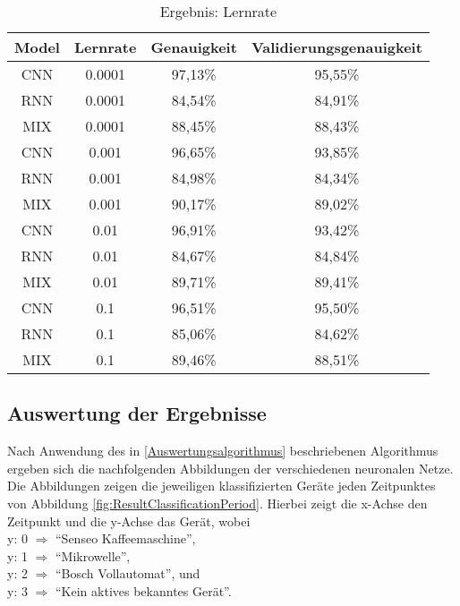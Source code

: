         \begin{table}[H]
            \centering
            \begin{tabular}{|c|c|c|c|}
                \hline
                Model & Lernrate & Genauigkeit & Validierungsgenauigkeit \\
                \hline
                CNN & 0.0001 & 97,13\% & 95,55\% \\
                \hline
                RNN & 0.0001 & 84,54\% & 84,91\% \\
                \hline
                MIX & 0.0001 & 88,45\% & 88,43\% \\
                \hline
                \hline
                CNN & 0.001  & 96,65\% & 93,85\% \\
                \hline
                RNN & 0.001  & 84,98\% & 84,34\% \\
                \hline
                MIX & 0.001  & 90,17\% & 89,02\% \\
                \hline
                \hline
                CNN & 0.01   & 96,91\% & 93,42\% \\
                \hline
                RNN & 0.01   & 84,67\% & 84,84\% \\
                \hline
                MIX & 0.01   & 89,71\% & 89,41\% \\
                \hline
                \hline
                CNN & 0.1    & 96,51\% & 95,50\% \\
                \hline
                RNN & 0.1    & 85,06\% & 84,62\% \\
                \hline
                MIX & 0.1    & 89,46\% & 88,51\% \\
                \hline
            \end{tabular}
            \caption{Ergebnis: Lernrate}
            \label{tabl:ErgebnisLernrate}
        \end{table}   


    \subsection{Auswertung der Ergebnisse}

        Nach Anwendung des in \ref{Auswertungsalgorithmus} beschriebenen Algorithmus ergeben sich die nachfolgenden Abbildungen der verschiedenen neuronalen Netze.
        Die Abbildungen zeigen die jeweiligen klassifizierten Geräte jeden Zeitpunktes von Abbildung \ref{fig:ResultClassificationPeriod}.
        Hierbei zeigt die x-Achse den Zeitpunkt und die y-Achse das Gerät, wobei \\
        y: 0 \( \Rightarrow \)  "`Senseo Kaffeemaschine"',\\
        \noindent
        y: 1 \( \Rightarrow \)  "`Mikrowelle"',\\
        \noindent
        y: 2 \( \Rightarrow \)  "`Bosch Vollautomat"', und\\
        \noindent
        y: 3 \( \Rightarrow \) "`Kein aktives bekanntes Gerät"'.
        \\
        
